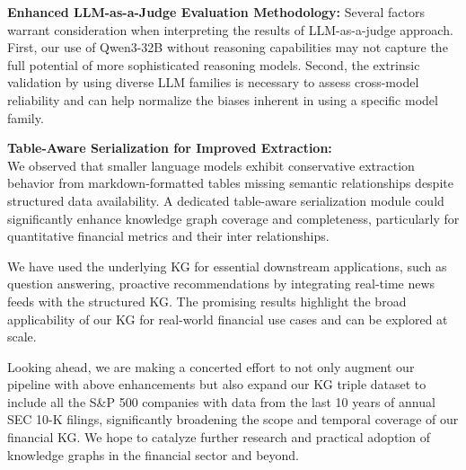     \textbf{Enhanced LLM-as-a-Judge Evaluation Methodology:} Several factors warrant consideration when interpreting the results of LLM-as-a-judge approach. First, our use of Qwen3-32B without reasoning capabilities may not capture the full potential of more sophisticated reasoning models. Second, the extrinsic validation by using diverse LLM families is necessary to assess cross-model reliability and can help normalize the biases inherent in using a specific model family.
    
\textbf{Table-Aware Serialization for Improved Extraction:}\\
    We observed that smaller language models exhibit conservative extraction behavior from markdown-formatted tables missing semantic relationships despite structured data availability. A dedicated table-aware serialization module could significantly enhance knowledge graph coverage and completeness, particularly for quantitative financial metrics and their inter relationships.

We have used the underlying KG for essential downstream applications, such as question answering, proactive recommendations by integrating real-time news feeds with the structured KG. The promising results highlight the broad applicability of our KG for real-world financial use cases and can be explored at scale. 

Looking ahead, we are making a concerted effort to not only augment our pipeline with above enhancements but also expand our KG triple dataset to include all the S\&P 500 companies with data from the last 10 years of annual SEC 10-K filings, significantly broadening the scope and temporal coverage of our financial KG. We hope to catalyze further research and practical adoption of knowledge graphs in the financial sector and beyond. 
